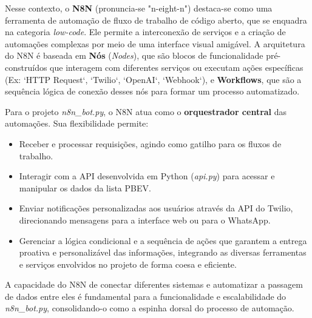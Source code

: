Nesse contexto, o \textbf{N8N} (pronuncia-se "n-eight-n") destaca-se como uma ferramenta de automação de fluxo de trabalho de código aberto, que se enquadra na categoria \textit{low-code}. Ele permite a interconexão de serviços e a criação de automações complexas por meio de uma interface visual amigável. A arquitetura do N8N é baseada em \textbf{Nós} (\textit{Nodes}), que são blocos de funcionalidade pré-construídos que interagem com diferentes serviços ou executam ações específicas (Ex: `HTTP Request`, `Twilio`, `OpenAI`, `Webhook`), e \textbf{Workflows}, que são a sequência lógica de conexão desses nós para formar um processo automatizado.

Para o projeto \textit{n8n\_bot.py}, o N8N atua como o \textbf{orquestrador central} das automações. Sua flexibilidade permite:
\begin{itemize}
    \item Receber e processar requisições, agindo como gatilho para os fluxos de trabalho.
    \item Interagir com a API desenvolvida em Python (\textit{api.py}) para acessar e manipular os dados da lista PBEV.
    \item Enviar notificações personalizadas aos usuários através da API do Twilio, direcionando mensagens para a interface web ou para o WhatsApp.
    \item Gerenciar a lógica condicional e a sequência de ações que garantem a entrega proativa e personalizável das informações, integrando as diversas ferramentas e serviços envolvidos no projeto de forma coesa e eficiente.
\end{itemize}
A capacidade do N8N de conectar diferentes sistemas e automatizar a passagem de dados entre eles é fundamental para a funcionalidade e escalabilidade do \textit{n8n\_bot.py}, consolidando-o como a espinha dorsal do processo de automação.